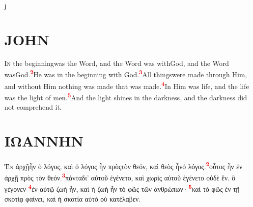 \renewcommand{\thefootnote}{\roman{footnote}}
\pagestyle{headings}

\newcommand{\vn}[1]{\textsuperscript{\textcolor{red}{\textbf{#1}}}\hspace{0.15em}\ignorespaces}
j
\begin{multicols}{2}
\section*{JOHN}
    \lettrine[lines=3,slope=4pt,nindent=-3pt]{I}{n} the beginning\footnotemark[1] was the Word\footnotemark[2], and the Word was with\footnotemark[3] God, and the Word was\footnotemark[4] God.\vn{2}He was in the beginning with God.\vn{3}All things\footnotemark[5] were made through Him, and without Him nothing was made that was made.\vn{4}In Him was life, and the life was the light of men.\vn{5}And the light shines in the darkness, and the darkness did not comprehend it.
\vfill\null
\columnbreak

\section*{ΙΩΑΝΝΗΝ}
	\lettrine[lines=3,slope=4pt,nindent=-3pt]{Ἐ}{ν} ἀρχῇ\footnotemark[1] ἦν ὁ λόγος\footnotemark[2], καὶ ὁ λόγος ἦν πρὸς\footnotemark[3] τὸν θεόν, καὶ θεὸς ἦν\footnotemark[4] ὁ λόγος.\vn{2}οὗτος ἦν ἐν ἀρχῇ πρὸς τὸν θεόν.\vn{3}πάντα\footnotemark[5] δι’ αὐτοῦ ἐγένετο, καὶ χωρὶς αὐτοῦ ἐγένετο οὐδὲ ἕν. ὃ γέγονεν \vn{4}ἐν αὐτῷ ζωὴ ἦν, καὶ ἡ ζωὴ ἦν τὸ φῶς τῶν ἀνθρώπων·\vn{5}καὶ τὸ φῶς ἐν τῇ σκοτίᾳ φαίνει, καὶ ἡ σκοτία αὐτὸ οὐ κατέλαβεν.
\end{multicols}

